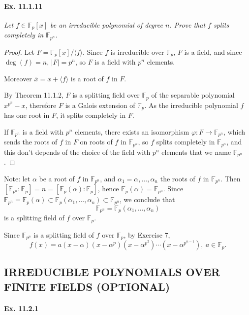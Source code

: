 \documentclass[11pt,a4paper]{article}
\newcommand{\F}{\mathbb{F}}
\begin{document}
\paragraph{Ex. 11.1.11}

{\it Let $f \in \F_p[x]$ be an irreducible polynomial of degree $n$. Prove that $f$ splits completely in $\F_{p^n}$.
}

\begin{proof} 
Let $F = \F_p[x]/\langle f \rangle$. Since $f$ is irreducible over $\F_p$, $F$ is a field, and since $\deg(f) = n$, $|F | = p^n$, so $F$ is a field with $p^n$ elements.

Moreover $\overline{x} = x + \langle f \rangle$ is a root of $f$ in $F$.

By Theorem 11.1.2, $F$ is a splitting field over $\F_p$ of the separable polynomial $x^{p^n} -x$, therefore $F$ is a Galois extension of $\F_p$. As the irreducible polynomial $f$ has one root in $F$, it splits completely in $F$.

If $\F_{p^n}$ is a field with $p^n$ elements, there exists an isomorphism $\varphi : F \to \F_{p^n}$, which sends the roots of $f$ in $F$ on roots of $f$ in $\F_{p^n}$, so $f$ splits completely in $\F_{p^n}$, and this don't depends of the choice of the field with $p^n$ elements that we name $\F_{p^n}$.
\end{proof}
\bigskip

Note: let $\alpha$ be a root of $f$ in $\F_{p^n}$, and $\alpha_1=\alpha,\ldots,\alpha_n$ the roots of $f$ in $\F_{p^n}$. Then $[\F_{p^n} : \F_p] = n =[\F_p(\alpha) : \F_p]$, hence $\F_p(\alpha) = \F_{p^n}$. Since $\F_{p^n} = \F_{p}(\alpha) \subset \F_{p}(\alpha_1,\ldots,\alpha_n) \subset \F_{p^n}$, we conclude that
$$\F_{p^n} = \F_p(\alpha_1,\ldots,\alpha_n)$$
is a splitting field of $f$ over $\F_p$.

Since $\F_{p^n}$ is a splitting field of $f$ over $\F_p$, by Exercise 7, 
$$f(x) = a (x -\alpha)(x - \alpha^p)(x-\alpha^{p^2})\cdots(x- \alpha^{p^{n-1}}),\ a \in \F_p.$$




\subsection{IRREDUCIBLE POLYNOMIALS OVER FINITE FIELDS (OPTIONAL)}

\paragraph{Ex. 11.2.1}
\end{document}
